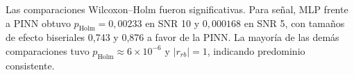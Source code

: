 Las comparaciones Wilcoxon--Holm fueron significativas. Para señal, MLP frente a PINN obtuvo $p_{\mathrm{Holm}}=0{,}00233$ en SNR 10 y $0{,}000168$ en SNR 5, con tamaños de efecto biseriales 0,743 y 0,876 a favor de la PINN. La mayoría de las demás comparaciones tuvo $p_{\mathrm{Holm}}\approx6\times10^{-6}$ y $|r_{rb}|=1$, indicando predominio consistente.

